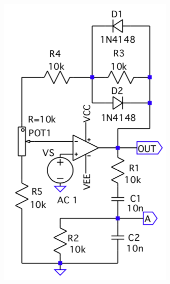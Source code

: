 \documentclass{article}
\begin{document}
	\begin{figure}[htb]
	    \begin{minipage}[t]{.5\linewidth}
	        \centering
			\includegraphics[width=\linewidth]{figure/circ1.png}
			\label{fig:circ1}
	    \end{minipage}
	    \begin{minipage}[t]{.5\linewidth}
	        \centering

\end{minipage}
\end{figure}
\end{document}
